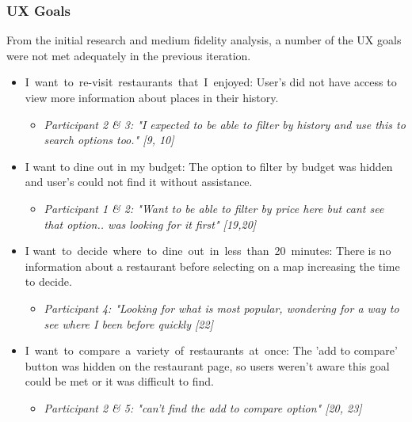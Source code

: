 \documentclass[a4 paper, 12pt]{article}
\begin{document}
    \subsubsection{UX Goals}  
    From the initial research and medium fidelity analysis, a number of the UX goals were not met adequately in the previous iteration.
        \begin{itemize}
            \item I want to re-visit restaurants that I enjoyed: User's did not have access to view more information about places in their history. 
                \begin{itemize}
                    \item \textit{Participant 2 \& 3: "I expected to be able to filter by history and use this to search options too." [9, 10]}
                \end{itemize}            
            \item I want to dine out in my budget: The option to filter by budget was hidden and user's could not find it without assistance.
                \begin{itemize}
                    \item \textit{Participant 1 \& 2: "Want to be able to filter by price here but cant see that option.. was looking for it first" [19,20]}
                \end{itemize}            
            \item I want to decide where to dine out in less than 20 minutes: There is no information about a restaurant before selecting on a map increasing the time to decide. 
                \begin{itemize}
                    \item \textit{Participant 4: "Looking for what is most popular, wondering for a way to see where I been before quickly [22]}
                \end{itemize}            
            \item I want to compare a variety of restaurants at once: The 'add to compare' button was hidden on the restaurant page, so users weren't aware this goal could be met or it was difficult to find. 
                \begin{itemize}
                    \item \textit{Participant 2 \& 5: "can't find the add to compare option" [20, 23]}
                \end{itemize}            
        \end{itemize}
\end{document}
